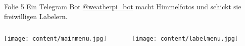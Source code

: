 \begin{frame}{Folie 5}
  Ein Telegram Bot
    \href{https://telegram.me/weatherpi_bot}{\alert{@weatherpi\_bot}}
    macht Himmelfotos und schickt sie freiwilligen Labelern.
  \begin{columns}
    \begin{column}[t]{0.5\textwidth}
      \centering
      \texttt{[image: content/mainmenu.jpg]}
    \end{column}
    \begin{column}[t]{0.5\textwidth}
      \centering
      \texttt{[image: content/labelmenu.jpg]}
    \end{column}
  \end{columns}
\end{frame}
